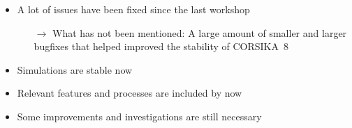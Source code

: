 \documentclass[aspectratio=1610, 9pt]{beamer}
\begin{document}
\begin{frame}

    \begin{itemize}
      \item A lot of issues have been fixed since the last workshop
      \begin{itemize}
        \item[$\rightarrow$] What has not been mentioned: A large amount of smaller and larger bugfixes that helped improved the stability of CORSIKA~8
      \end{itemize}
      \item Simulations are stable now
      \item Relevant features and processes are included by now
      \item Some improvements and investigations are still necessary
    \end{itemize}
\end{frame}
\end{document}
